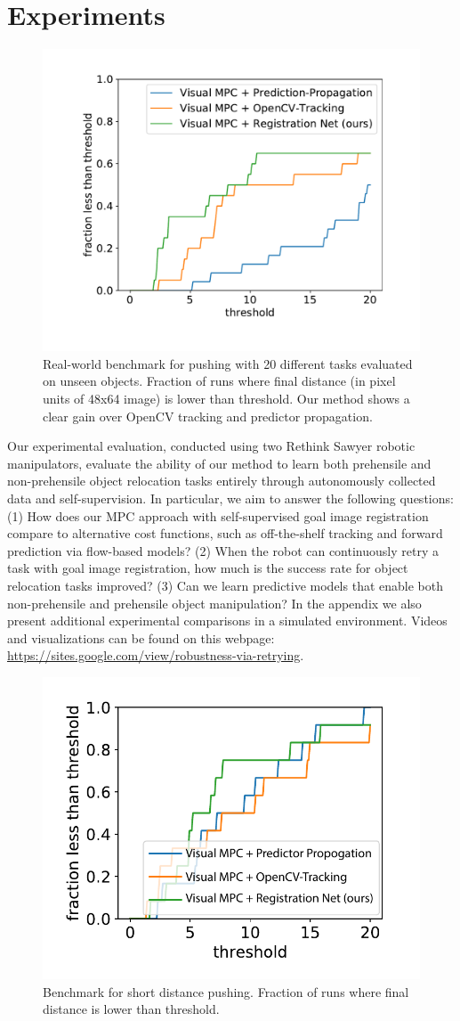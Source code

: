 
\vspace{-0.1cm}
\section{Experiments}
\vspace{-0.2cm}

\begin{figure}
\vspace{-0.3in}
\centering
\includegraphics[width=0.35\columnwidth]{images/pushlong_bench_same_range.pdf}
\caption{\small{Real-world benchmark for pushing with 20 different tasks evaluated on unseen objects. Fraction of runs where final distance (in pixel units of 48x64 image) is lower than threshold. Our method shows a clear gain over OpenCV tracking and predictor propagation.}}
\label{fig:push_bench_long}
\vspace{-0.3in}
\end{figure}


Our experimental evaluation, conducted using two Rethink Sawyer robotic manipulators, evaluate the ability of our method to learn both prehensile and non-prehensile object relocation tasks entirely through autonomously collected data and self-supervision. In particular, we aim to answer the following questions: (1) How does our MPC approach with self-supervised goal image registration compare to alternative cost functions, such as off-the-shelf tracking and forward prediction via flow-based models? (2) When the robot can continuously retry a task with goal image registration, how much is the success rate for object relocation tasks improved? (3) Can we learn predictive models that enable both non-prehensile and prehensile object manipulation? In the appendix we also present additional experimental comparisons in a simulated environment.
Videos and visualizations can be found on this webpage: \url{https://sites.google.com/view/robustness-via-retrying}.

\begin{figure}
	\vspace{-0.3in}
	\centering
	\includegraphics[width=0.35\columnwidth]{images/pushshort_bench_plots.pdf}
	\caption{\small{Benchmark for short distance pushing.  Fraction of runs where final distance is lower than threshold.}}
	\label{fig:push_bench_short}
\end{figure}

